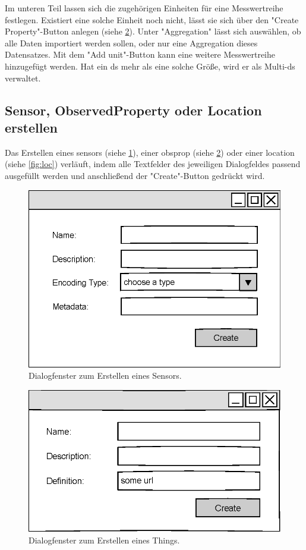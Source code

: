 \documentclass[a4paper, 12 pt]{article}
\begin{document}
Im unteren Teil lassen sich die zugehörigen Einheiten für eine Messwertreihe festlegen. Existiert eine solche Einheit noch nicht, lässt sie sich über den "{Create Property}"{-Button} anlegen (siehe \cref{fig:oprop}). Unter \string"Aggregation\string" lässt sich auswählen, ob alle Daten importiert werden sollen, oder nur eine Aggregation dieses Datensatzes. Mit dem "{Add unit}"{-Button} kann eine weitere Messwertreihe hinzugefügt werden. Hat ein \gls{ds} mehr als eine solche Größe, wird er als Multi-\gls{ds} verwaltet.



\subsection{Sensor, ObservedProperty oder Location erstellen}
Das Erstellen eines \gls{sensor}s (siehe \cref{fig:sensor}), einer \gls{obsprop} (siehe \cref{fig:oprop}) oder einer \gls{location} (siehe \cref{fig:loc}) verläuft, indem alle Textfelder des jeweiligen Dialogfeldes passend ausgefüllt werden und anschließend der "{Create}"{-Button} gedrückt wird.

\begin{figure}[htbp]
\centering
\includegraphics[scale=1]{images/sensor}
\caption{\label{fig:sensor}Dialogfenster zum Erstellen eines Sensors.}
\end{figure}

\begin{figure}[htbp]
\centering
\includegraphics[scale=1]{images/oprop}
\caption{\label{fig:oprop}Dialogfenster zum Erstellen eines Things.}
\end{figure}
\end{document}
